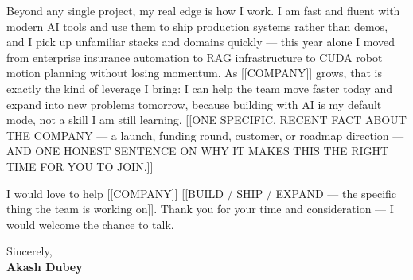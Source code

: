 \documentclass[letterpaper,11pt]{article}
\begin{document}
Beyond any single project, my real edge is how I work. I am fast and fluent
with modern AI tools and use them to ship production systems rather than demos,
and I pick up unfamiliar stacks and domains quickly --- this year alone I moved
from enterprise insurance automation to RAG infrastructure to CUDA robot motion
planning without losing momentum. As [[COMPANY]] grows, that is exactly the kind
of leverage I bring: I can help the team move faster today and expand into new
problems tomorrow, because building with AI is my default mode, not a skill I am
still learning. [[ONE SPECIFIC, RECENT FACT ABOUT THE COMPANY --- a launch,
funding round, customer, or roadmap direction --- AND ONE HONEST SENTENCE ON WHY
IT MAKES THIS THE RIGHT TIME FOR YOU TO JOIN.]]

I would love to help [[COMPANY]] [[BUILD / SHIP / EXPAND --- the specific thing
the team is working on]]. Thank you for your time and consideration --- I would
welcome the chance to talk.

\vspace{6pt}
Sincerely, \\
\textbf{Akash Dubey}
\end{document}
